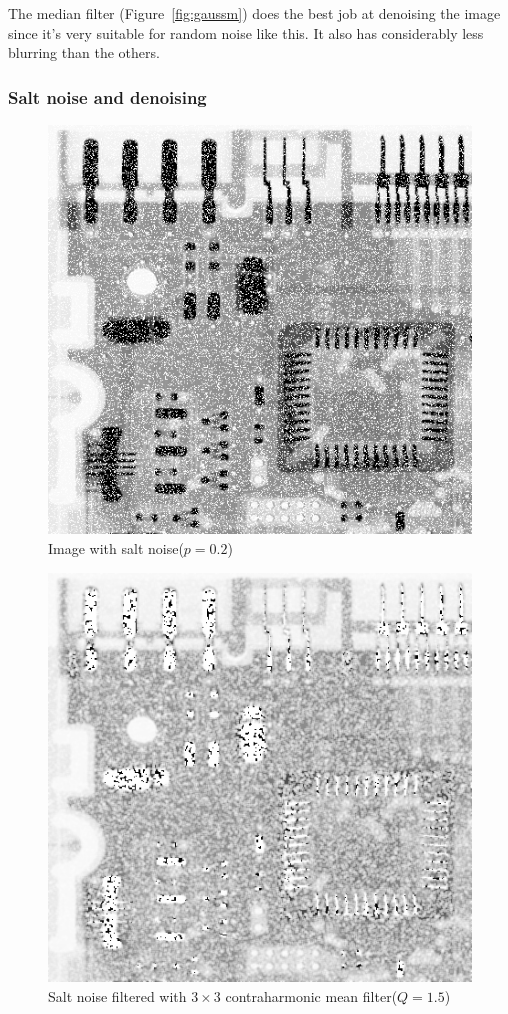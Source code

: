 \documentclass{article}
\begin{document}
The median filter (Figure~\ref{fig:gaussm}) does the best job at denoising the image since it's very suitable for random noise like this. It also has considerably less
blurring than the others.

\subsubsection{Salt noise and denoising}


\begin{figure}[H]
	\centering
	\includegraphics[width=336pt]{../result/task2/salt/salt-20.png}
	\caption{Image with salt noise($p=0.2$)}
	\label{fig:salt}
\end{figure}

\begin{figure}[H]
	\centering
	\includegraphics[width=336pt]{../result/task2/salt/salt-contraharmonic-1-5.png}
	\caption{Salt noise filtered with $3 \times 3$ contraharmonic mean filter($Q = 1.5$)}
	\label{fig:saltchmpos}
\end{figure}
\end{document}
